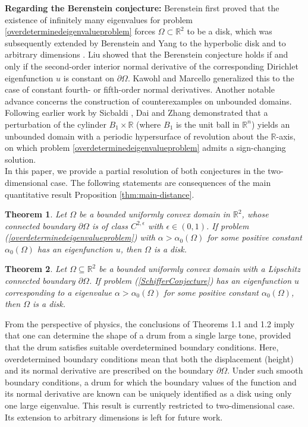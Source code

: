 \documentclass[12pt]{article}
\newtheorem{thm}{Theorem}[section]
\numberwithin{equation}{section}
\numberwithin{equation}{section}
\begin{document}
\textbf{Regarding the Berenstein conjecture:} Berenstein \cite{Berenstein} first proved that the existence of infinitely many eigenvalues for problem \eqref{overdeterminedeigenvalueproblem} forces $\Omega\subset\mathbb{R}^2$ to be a disk, which was subsequently extended by Berenstein and Yang to the hyperbolic disk \cite{Berenstein1} and to arbitrary dimensions \cite{Berenstein2}. Liu \cite{Liu} showed that the Berenstein conjecture holds if and only if the second-order interior normal derivative of the corresponding Dirichlet eigenfunction $u$ is constant on $\partial\Omega$. Kawohl and Marcello \cite{Kawohl} generalized this to the case of constant fourth- or fifth-order normal derivatives. Another notable advance concerns the construction of counterexamples on unbounded domains. Following earlier work by Sicbaldi \cite{Sicbaldi}, Dai and Zhang \cite{DaiZ} demonstrated that a perturbation of the cylinder $B_1\times\mathbb{R}$ (where $B_1$ is the unit ball in $\mathbb{R}^n$) yields an unbounded domain with a periodic hypersurface of revolution about the $\mathbb{R}$-axis, on which problem \eqref{overdeterminedeigenvalueproblem} admits a sign-changing solution.\\

In this paper, we provide a partial resolution of both conjectures in the two-dimensional
case.
The following statements are consequences of the main quantitative result Proposition \ref{thm:main-distance}.

\begin{thm}\label{Theorem 1.1}
Let $\Omega$ be a bounded uniformly
convex domain in $\mathbb{R}^{2}$, whose connected boundary $\partial \Omega$ is of class $C^{2,\epsilon}$ with $\epsilon\in(0,1)$. If problem (\ref{overdeterminedeigenvalueproblem}) with $\alpha>\alpha_0(\Omega)$ for some positive constant $\alpha_0(\Omega)$
has an eigenfunction $u$, then $\Omega$ is a disk.
\end{thm}
\begin{thm}\label{Theorem 1.2}
Let $\Omega\subseteq\mathbb{R}^{2}$ be a bounded uniformly
convex domain with a Lipschitz connected boundary $\partial \Omega$. If problem (\ref{SchifferConjecture}) has an eigenfunction $u$ corresponding to a eigenvalue $\alpha>\alpha_0(\Omega)$ for some positive constant $\alpha_0(\Omega)$, then $\Omega$ is a disk.
\end{thm}

From the perspective of physics, the conclusions of Theorems 1.1 and 1.2 imply that one can determine the shape of a drum from a single large tone, provided that the drum satisfies suitable overdetermined boundary conditions. Here, overdetermined boundary conditions mean that both the displacement (height) and its normal derivative are prescribed on the boundary $\partial \Omega$. Under such smooth boundary conditions, a drum for which the boundary values of the function and its normal derivative are known can be uniquely identified as a disk using only one large eigenvalue. This result is currently restricted to two-dimensional case. Its extension to arbitrary dimensions is left for future work.
\end{document}
